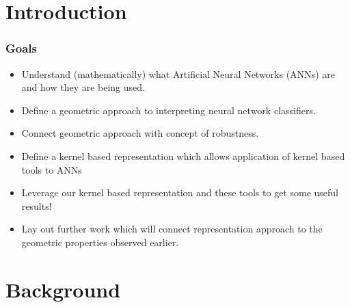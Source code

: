 \section{Introduction} %
\label{Chapter1} %




\begin{frame}
  \frametitle{Goals}
  \begin{itemize}
      \item<1-> Understand (mathematically) what Artificial Neural
        Networks (ANNs) are and how they are being used. 
      \item<2-> Define a geometric approach to interpreting neural
        network classifiers. 
      \item<3-> Connect geometric approach with concept of 
        robustness. 
      \item<4-> Define a kernel based representation which allows application
        of kernel based tools to ANNs
      \item<5-> Leverage our kernel based representation and these
        tools to get some useful results!
      \item<6-> Lay out further work which will connect representation
        approach to the geometric properties observed earlier. 
  \end{itemize}
\end{frame}

\section{Background}


